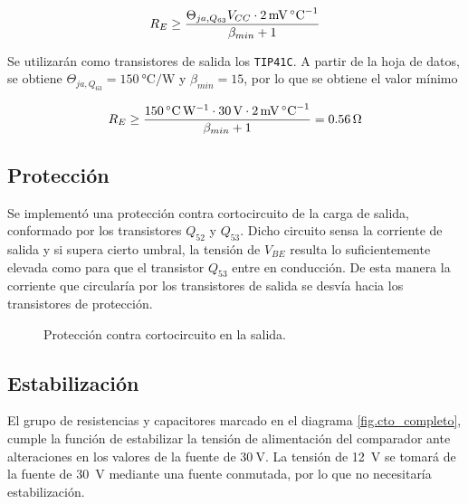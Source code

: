 \begin{equation}
	\centering
	R_E \geq \frac{\Theta_{ja,Q_{63}} V_{CC} \cdot \SI{2}{\milli\volt\per\celsius}}{\beta_{min} + 1}
	\label{ec.re}
\end{equation}
	
	Se utilizarán como transistores de salida los \texttt{TIP41C}. A partir de la hoja de datos, se obtiene $\Theta_{ja,Q_{63}} = \SI{150}{\celsius\per\watt}$ y $\beta_{min} = 15$, por lo que se obtiene el valor mínimo

	\begin{equation}
		\centering
		R_E \geq \frac{ \SI{150}{\celsius\per\watt} \cdot \SI{30}{\volt} \cdot \SI{2}{\milli\volt\per\celsius} }{ \beta_{min} + 1 } = \SI{0.56}{\ohm}
	\end{equation}

	\subsection{Protección}
	Se implementó una protección contra cortocircuito de la carga de salida, conformado por los transistores $Q_{52}$ y $Q_{53}$. Dicho circuito sensa la corriente de salida y si supera cierto umbral, la tensión de $V_{BE}$ resulta lo suficientemente elevada como para que el transistor $Q_{53}$ entre en conducción. De esta manera la corriente que circularía por los transistores de salida se desvía hacia los transistores de protección.

	\begin{figure}[H]
		\centering
		\scalebox{0.5}{}
		\caption{Protección contra cortocircuito en la salida.}
		\label{fig.proteccion}
	\end{figure}

	\subsection{Estabilización}

	El grupo de resistencias y capacitores marcado en el diagrama \ref{fig.cto_completo}, cumple la función de estabilizar la tensión de alimentación del comparador ante alteraciones en los valores de la fuente de $\SI{30}{\volt}$. La tensión de \SI{12}{\volt} se tomará de la fuente de \SI{30}{\volt} mediante una fuente conmutada, por lo que no necesitaría estabilización.

